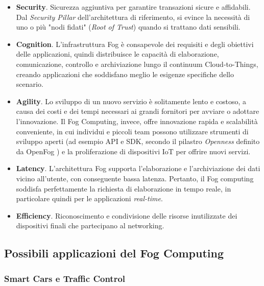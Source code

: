 \begin{itemize}
	\item \textbf{Security}. Sicurezza aggiuntiva per garantire transazioni sicure e affidabili. Dal \textit{Security Pillar} dell'architettura di riferimento, si evince la necessità di uno o più "nodi fidati" (\textit{Root of Trust}) quando si trattano dati sensibili.
	\item \textbf{Cognition}. L'infrastruttura Fog è consapevole dei requisiti e degli obiettivi delle applicazioni, quindi distribuisce le capacità di elaborazione, comunicazione, controllo e archiviazione lungo il continuum Cloud-to-Things, creando applicazioni che soddisfano meglio le esigenze specifiche dello scenario.
	\item \textbf{Agility}. Lo sviluppo di un nuovo servizio è solitamente lento e costoso, a causa dei costi e dei tempi necessari ai grandi fornitori per avviare o adottare l'innovazione. Il Fog Computing, invece, offre innovazione rapida e scalabilità conveniente, in cui individui e piccoli team possono utilizzare strumenti di sviluppo aperti (ad esempio API e SDK, secondo il pilastro \textit{Openness} definito da OpenFog \cite{OpenFogReferenceArchitecture}) e la proliferazione di dispositivi IoT per offrire nuovi servizi.
	\item \textbf{Latency}. L'architettura Fog supporta l'elaborazione e l'archiviazione dei dati vicino all'utente, con conseguente bassa latenza. Pertanto, il Fog computing soddisfa perfettamente la richiesta di elaborazione in tempo reale, in particolare quindi per le applicazioni \textit{real-time}.
	\item \textbf{Efficiency}. Riconoscimento e condivisione delle risorse inutilizzate dei dispositivi finali che partecipano al networking.
\end{itemize}

\subsection{Possibili applicazioni del Fog Computing}

\subsubsection{Smart Cars e Traffic Control}

